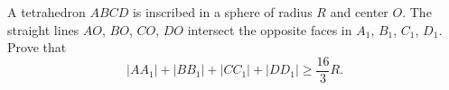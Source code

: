 A tetrahedron $ABCD$ is inscribed in a sphere of radius $R$ and center $O$. The straight lines $AO$, $BO$, $CO$, $DO$ intersect the opposite faces in $A_1$, $B_1$, $C_1$, $D_1$. Prove that
\[ |AA_1| + |BB_1| + |CC_1| + |DD_1| \geq \frac{16}{3}R. \]
